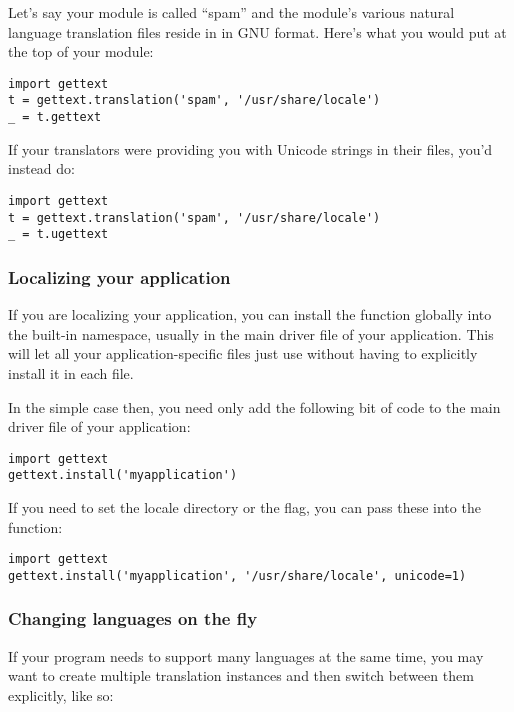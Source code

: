 Let's say your module is called ``spam'' and the module's various
natural language translation  files reside in
 in GNU  format.  Here's what
you would put at the top of your module:

\begin{verbatim}
import gettext
t = gettext.translation('spam', '/usr/share/locale')
_ = t.gettext
\end{verbatim}

If your translators were providing you with Unicode strings in their
 files, you'd instead do:

\begin{verbatim}
import gettext
t = gettext.translation('spam', '/usr/share/locale')
_ = t.ugettext
\end{verbatim}

\subsubsection{Localizing your application}

If you are localizing your application, you can install the \function{_()}
function globally into the built-in namespace, usually in the main driver file
of your application.  This will let all your application-specific
files just use  without having to explicitly install it in
each file.

In the simple case then, you need only add the following bit of code
to the main driver file of your application:

\begin{verbatim}
import gettext
gettext.install('myapplication')
\end{verbatim}

If you need to set the locale directory or the  flag,
you can pass these into the  function:

\begin{verbatim}
import gettext
gettext.install('myapplication', '/usr/share/locale', unicode=1)
\end{verbatim}

\subsubsection{Changing languages on the fly}

If your program needs to support many languages at the same time, you
may want to create multiple translation instances and then switch
between them explicitly, like so:

